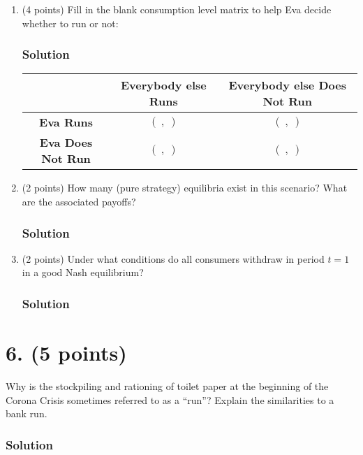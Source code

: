 \documentclass[12pt]{article}
\begin{document}
\begin{enumerate}[label=(\alph*)]
    \item (4 points) Fill in the blank consumption level matrix to help Eva decide whether to run or not:
    \subsubsection*{Solution}

    
    \begin{center}
        \begin{tabular}{|c|c|c|}
            \hline
            & \textbf{Everybody else Runs} & \textbf{Everybody else Does Not Run} \\
            \hline
            \textbf{Eva Runs} & $(\ ,\ )$ & $(\ ,\ )$ \\
            \hline
            \textbf{Eva Does Not Run} & $(\ ,\ )$ & $(\ ,\ )$ \\
            \hline
        \end{tabular}
    \end{center}

    \item (2 points) How many (pure strategy) equilibria exist in this scenario? What are the associated payoffs?
    \subsubsection*{Solution}

    \item (2 points) Under what conditions do all consumers withdraw in period $t = 1$ in a good Nash equilibrium?
    \subsubsection*{Solution}

    
\end{enumerate}

\section*{6. (5 points)}

Why is the stockpiling and rationing of toilet paper at the beginning of the Corona Crisis sometimes referred to as a “run”? Explain the similarities to a bank run.
\subsubsection*{Solution}
\end{document}
